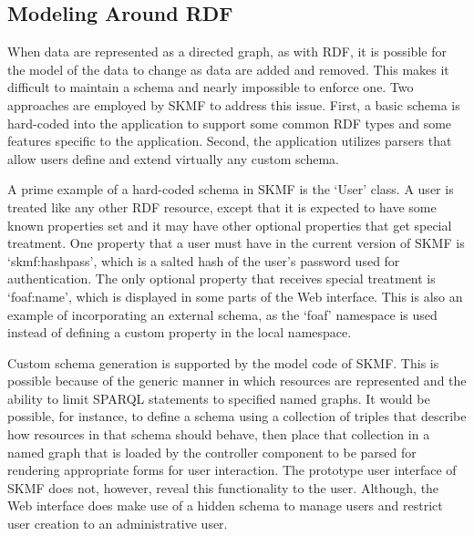 \subsection{Modeling Around RDF}

When data are represented as a directed graph, as with RDF, it is possible for the model of the data to change as data are added and removed. This makes it difficult to maintain a schema and nearly impossible to enforce one. Two approaches are employed by SKMF to address this issue. First, a basic schema is hard-coded into the application to support some common RDF types and some features specific to the application. Second, the application utilizes parsers that allow users define and extend virtually any custom schema.

A prime example of a hard-coded schema in SKMF is the `User' class. A user is treated like any other RDF resource, except that it is expected to have some known properties set and it may have other optional properties that get special treatment. One property that a user must have in the current version of SKMF is `skmf:hashpass', which is a salted hash of the user's password used for authentication. The only optional property that receives special treatment is `foaf:name', which is displayed in some parts of the Web interface. This is also an example of incorporating an external schema, as the `foaf' namespace is used instead of defining a custom property in the local namespace.

Custom schema generation is supported by the model code of SKMF. This is possible because of the generic manner in which resources are represented and the ability to limit SPARQL statements to specified named graphs. It would be possible, for instance, to define a schema using a collection of triples that describe how resources in that schema should behave, then place that collection in a named graph that is loaded by the controller component to be parsed for rendering appropriate forms for user interaction. The prototype user interface of SKMF does not, however, reveal this functionality to the user. Although, the Web interface does make use of a hidden schema to manage users and restrict user creation to an administrative user.

